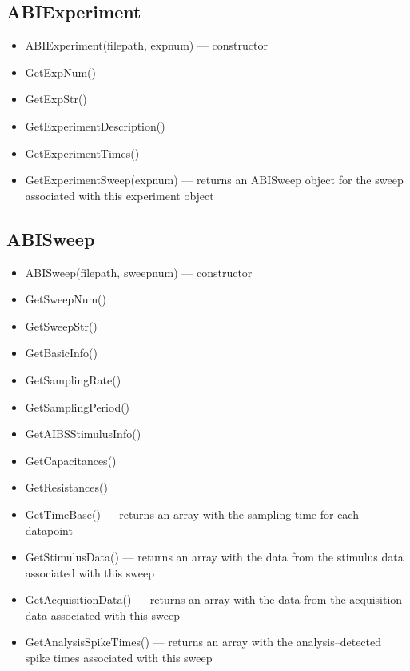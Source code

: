 \documentclass{article}
\begin{document}
\subsection{ABIExperiment}
\begin{itemize}
	\item ABIExperiment(filepath, expnum) --- constructor
	\item GetExpNum()
	\item GetExpStr()
	\item GetExperimentDescription()
	\item GetExperimentTimes()
	\item GetExperimentSweep(expnum)  --- returns an ABISweep object for the sweep associated with this experiment object
\end{itemize}

\subsection{ABISweep}
\begin{itemize}
	\item ABISweep(filepath, sweepnum) --- constructor
	\item GetSweepNum()
	\item GetSweepStr()
	\item GetBasicInfo()
	\item GetSamplingRate()
	\item GetSamplingPeriod()
	\item GetAIBSStimulusInfo()
	\item GetCapacitances()
	\item GetResistances()
	\item GetTimeBase() --- returns an array with the sampling time for each datapoint
	\item GetStimulusData() --- returns an array with the data from the stimulus data associated with this sweep
	\item GetAcquisitionData() --- returns an array with the data from the acquisition data associated with this sweep
	\item GetAnalysisSpikeTimes() --- returns an array with the analysis--detected spike times associated with this sweep
\end{itemize}

{}
{}
{\footnotesize}
\end{document}
